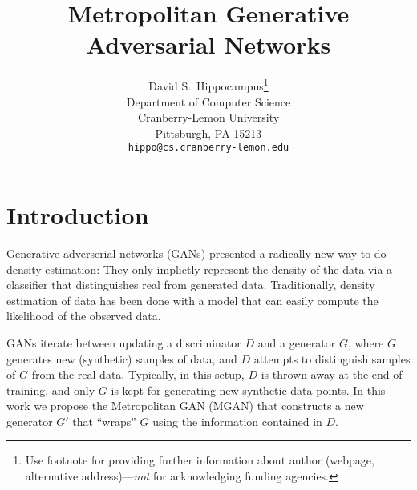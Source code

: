 \documentclass{article}
\title{Metropolitan Generative Adversarial Networks}
\author{
  David S.~Hippocampus\thanks{Use footnote for providing further
    information about author (webpage, alternative
    address)---\emph{not} for acknowledging funding agencies.} \\
  Department of Computer Science\\
  Cranberry-Lemon University\\
  Pittsburgh, PA 15213 \\
  \texttt{hippo@cs.cranberry-lemon.edu} \\
}
\begin{document}

\maketitle


\section{Introduction}

Generative adverserial networks (GANs) presented a radically new way to do density estimation:
They only implictly represent the density of the data via a classifier that distinguishes real from generated data.
Traditionally, density estimation of data has been done with a model that can easily compute the likelihood of the observed data.

GANs iterate between updating a discriminator $D$ and a generator $G$, where $G$ generates new (synthetic) samples of data, and $D$ attempts to distinguish samples of $G$ from the real data.
Typically, in this setup, $D$ is thrown away at the end of training, and only $G$ is kept for generating new synthetic data points.
In this work we propose the Metropolitan GAN (MGAN) that constructs a new generator $G'$ that ``wraps'' $G$ using the information contained in $D$.

\end{document}

